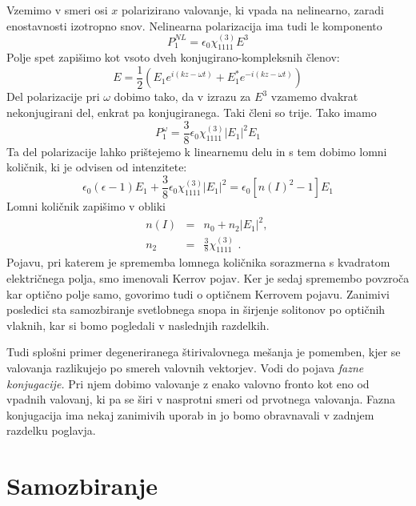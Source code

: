 Vzemimo v smeri osi $x$ polarizirano valovanje, ki vpada na nelinearno,
zaradi enostavnosti izotropno snov. Nelinearna polarizacija ima tudi
le komponento 
\begin{equation}
P_{1}^{NL}=\epsilon_{0}\chi_{1111}^{(3)}E^{3}\label{8.70}
\end{equation}
 Polje spet zapišimo kot vsoto dveh konjugirano-kompleksnih členov:
\begin{equation}
E=\frac{1}{2}(E_{1}e^{i(kz-\omega t)}+E_{1}^{*}e^{-i(kz-\omega t)})\label{8.71}
\end{equation}
 Del polarizacije pri $\omega$ dobimo tako, da v izrazu za $E^{3}$
vzamemo dvakrat nekonjugirani del, enkrat pa konjugiranega. Taki členi
so trije. Tako imamo 
\begin{equation}
P_{1}^{\omega}=\frac{3}{8}\epsilon_{0}\chi_{1111}^{\left(3\right)}|E_{1}|^{2}E_{1}\label{8.72}
\end{equation}
 Ta del polarizacije lahko prištejemo k linearnemu delu in s tem dobimo
lomni količnik, ki je odvisen od intenzitete: 
\begin{equation}
\epsilon_{0}(\epsilon-1)E_{1}+\frac{3}{8}\epsilon_{0}\chi_{1111}^{\left(3\right)}|E_{1}|^{2}=\epsilon_{0}[n(I)^{2}-1]E_{1}\label{8.73}
\end{equation}
 Lomni količnik zapišimo v obliki 
\begin{eqnarray}
n(I) & = & n_{0}+n_{2}|E_{1}|^{2}\text{, }\\
n_{2} & = & \frac{3}{8}\chi_{1111}^{\left(3\right)}\text{ .}\label{8.74}
\end{eqnarray}
 Pojavu, pri katerem je sprememba lomnega količnika sorazmerna s kvadratom
električnega polja, smo imenovali Kerrov pojav. Ker je sedaj spremembo
povzroča kar optično polje samo, govorimo tudi o optičnem Kerrovem
pojavu. Zanimivi posledici sta samozbiranje svetlobnega snopa in širjenje
solitonov po optičnih vlaknih, kar si bomo pogledali v naslednjih
razdelkih.

Tudi splošni primer degeneriranega štirivalovnega mešanja je pomemben,
kjer se valovanja razlikujejo po smereh valovnih vektorjev. Vodi do
pojava \textit{fazne konjugacije. }Pri njem dobimo valovanje z enako
valovno fronto kot eno od vpadnih valovanj, ki pa se širi v nasprotni
smeri od prvotnega valovanja. Fazna konjugacija ima nekaj zanimivih
uporab in jo bomo obravnavali v zadnjem razdelku poglavja.


\section{Samozbiranje}


